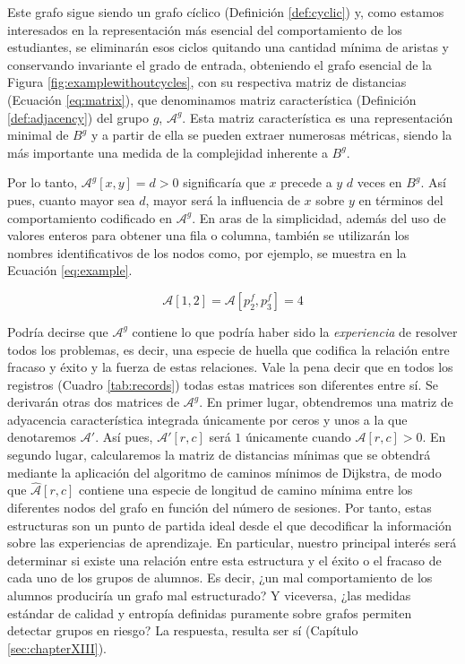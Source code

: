 Este grafo sigue siendo un grafo cíclico (Definición \ref{def:cyclic}) y, como estamos interesados en la representación más esencial del comportamiento de los estudiantes, se eliminarán esos ciclos quitando una cantidad mínima de aristas y conservando invariante el grado de entrada, obteniendo el grafo esencial de la Figura \ref{fig:examplewithoutcycles}, con su respectiva matriz de distancias (Ecuación \ref{eq:matrix}), que denominamos matriz característica (Definición \ref{def:adjacency}) del grupo $g$, $\mathcal{A}^g$. Esta matriz característica es una representación minimal de $B^g$ y a partir de ella se pueden extraer numerosas métricas, siendo la más importante una medida de la complejidad inherente a $B^g$.

Por lo tanto, $\mathcal{A}^g[x,y] = d > 0$ significaría que $x$ precede a $y$ $d$ veces en $B^g$. Así pues, cuanto mayor sea $d$, mayor será la influencia de $x$ sobre $y$ en términos del comportamiento codificado en $\mathcal{A}^g$. En aras de la simplicidad, además del uso de valores enteros para obtener una fila o columna, también se utilizarán los nombres identificativos de los nodos como, por ejemplo, se muestra en la Ecuación \ref{eq:example}.

\begin{equation}\label{eq:example}
\mathcal{A}[1,2] = \mathcal{A}[p_2^f,p_3^f] = 4
\end{equation}

Podría decirse que $\mathcal{A}^g$ contiene lo que podría haber sido la \emph{experiencia} de resolver todos los problemas, es decir, una especie de huella que codifica la relación entre fracaso y éxito y la fuerza de estas relaciones. Vale la pena decir que en todos los registros (Cuadro \ref{tab:records}) todas estas matrices son diferentes entre sí. Se derivarán otras dos matrices de $\mathcal{A}^g$. En primer lugar, obtendremos una matriz de adyacencia característica integrada únicamente por ceros y unos a la que denotaremos $\mathcal{A}'$. Así pues, $\mathcal{A}'[r, c]$ será $1$ únicamente cuando $\mathcal{A}[r, c] > 0$. En segundo lugar, calcularemos la matriz de distancias mínimas que se obtendrá mediante la aplicación del algoritmo de caminos mínimos de Dijkstra, de modo que $\hat{\mathcal{A}}[r, c]$ contiene una especie de longitud de camino mínima entre los diferentes nodos del grafo en función del número de sesiones. Por tanto, estas estructuras son un punto de partida ideal desde el que decodificar la información sobre las experiencias de aprendizaje. En particular, nuestro principal interés será determinar si existe una relación entre esta estructura y el éxito o el fracaso de cada uno de los grupos de alumnos. Es decir, ¿un mal comportamiento de los alumnos produciría un grafo mal estructurado? Y viceversa, ¿las medidas estándar de calidad y entropía definidas puramente sobre grafos permiten detectar grupos en riesgo? La respuesta, resulta ser sí (Capítulo \ref{sec:chapterXIII}).

